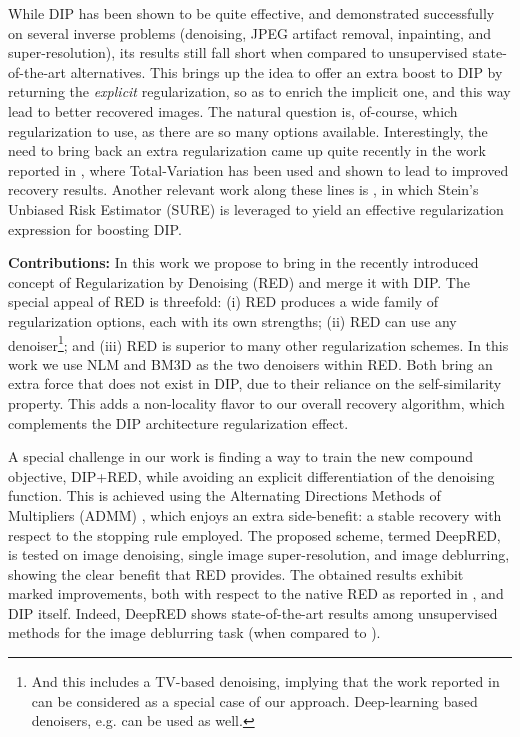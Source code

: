 \documentclass[12pt]{article}
\begin{document}
While DIP has been shown to be quite effective, and demonstrated successfully on several inverse problems (denoising, JPEG artifact removal, inpainting,  and super-resolution), its results still fall short when compared to unsupervised state-of-the-art alternatives. This brings up the idea to offer an extra boost to DIP by returning the \emph{explicit} regularization, so as to enrich the implicit one, and this way lead to better recovered images. The natural question is, of-course, which regularization to use, as there are so many options available. Interestingly, the need to bring back an extra regularization came up quite recently in the work reported in \cite{DIP-TV}, where Total-Variation \cite{rudin1992nonlinear} has been used and shown to lead to improved recovery results. Another relevant work along these lines is \cite{metzler2018unsupervised}, in which Stein's Unbiased Risk Estimator (SURE) is leveraged to yield an effective regularization expression for boosting DIP. 

{\bf Contributions: }In this work we propose to bring in the recently introduced concept of Regularization by Denoising (RED) \cite{RED-2017} and merge it with DIP. The special appeal of RED is threefold:  (i) RED produces a wide family of regularization options, each with its own strengths; (ii)  RED can use any denoiser\footnote{And this includes a TV-based denoising, implying that the work reported in \cite{DIP-TV} can be considered as a special case of our approach. Deep-learning based denoisers, e.g. \cite{DL1, DL2, DL3, DL4} can be used as well.}; and (iii) RED is superior to many other regularization schemes. In this work we use NLM \cite{NLM} and BM3D \cite{BM3D} as the two denoisers within RED. Both bring an extra force that does not exist in DIP, due to their reliance on the self-similarity property. This adds a non-locality flavor to our overall recovery algorithm, which complements the DIP architecture regularization effect.

A special challenge in our work is finding a way to train the new compound objective, DIP+RED, while avoiding an explicit differentiation of the denoising function. This is achieved using the Alternating Directions Methods of Multipliers (ADMM) \cite{ADMM}, which enjoys an extra side-benefit: a stable recovery with respect to the stopping rule employed. The proposed scheme, termed DeepRED, is tested on image denoising, single image super-resolution, and image deblurring, showing the clear benefit that RED provides. The obtained results exhibit marked improvements, both with respect to the native RED as reported in \cite{RED-2017}, and DIP itself. Indeed, DeepRED shows state-of-the-art results among unsupervised methods for the image deblurring task (when compared to \cite{multi}).
\end{document}
